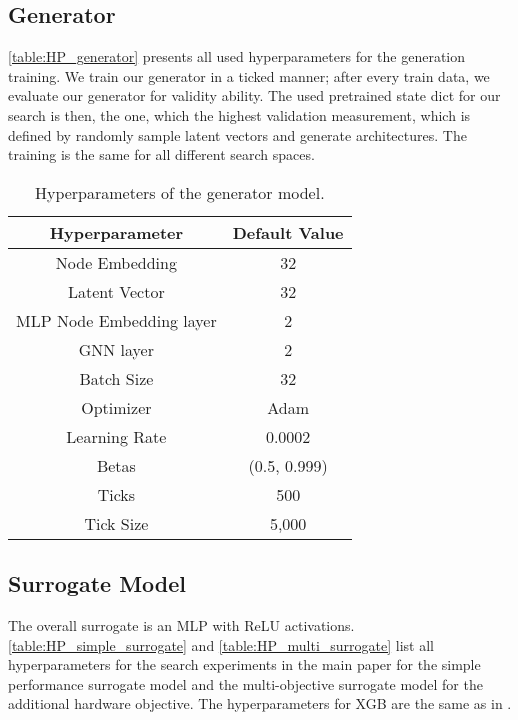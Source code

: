 \documentclass[runningheads]{llncs}
\begin{document}
\subsection{Generator}
\autoref{table:HP_generator} presents all used hyperparameters for the generation training. 
We train our generator in a ticked manner; after every  train data, we evaluate our generator for validity ability. The used pretrained state dict for our search is then, the one, which the highest validation measurement, which is defined by randomly sample  latent vectors  and generate architectures. 
The training is the same for all different search spaces.
\begin{table}[h]
	\scriptsize
	\centering
	\caption{Hyperparameters of the generator model.}\label{table:HP_generator}
	\begin{tabular}{ c || c}
		\toprule
		
		Hyperparameter      & Default Value  \\
		\midrule
		Node Embedding      & 32        \\
		Latent Vector       & 32       \\
		MLP Node Embedding layer & 2         \\
		GNN layer           & 2       \\
		Batch Size          & 32       \\
		Optimizer            & Adam \cite{2015ADAM}     \\
		Learning Rate       &  0.0002    \\
		Betas       & (0.5, 0.999)        \\
		Ticks     & 500 \\
		Tick Size & 5,000  \\
		\bottomrule
	\end{tabular}
\end{table}

\subsection{Surrogate Model}
The overall surrogate is an MLP with ReLU activations.
\autoref{table:HP_simple_surrogate} and \autoref{table:HP_multi_surrogate} list all hyperparameters for the search experiments in the main paper for the simple performance surrogate model and the multi-objective surrogate model for the additional hardware objective.
The hyperparameters for XGB \cite{XGB} are the same as in \cite{NBSuite}. 
\end{document}
